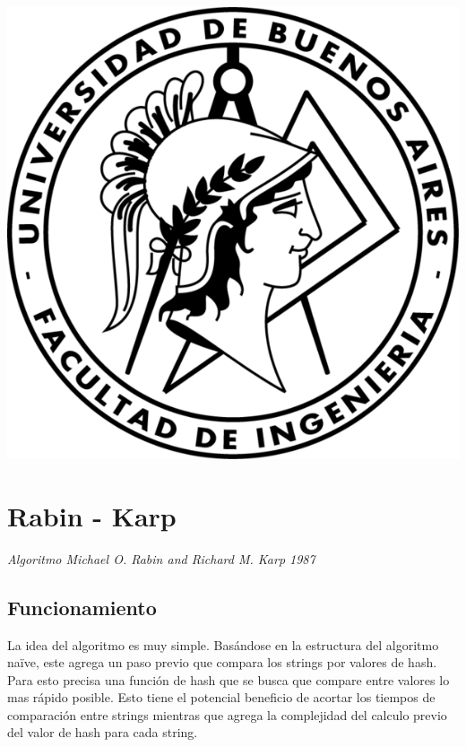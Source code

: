 \documentclass[a4paper, 10pt]{article}
\newcommand\tab[1][0.5cm]{\hspace*{#1}}
\begin{document}
    \newpage

    \begin{center}
        \includegraphics{images/logo}
    \end{center}


    \maketitle
    \newpage
    \tableofcontents
    \newpage
	
	\section{Rabin - Karp}
		
		\emph{Algoritmo Michael O. Rabin and Richard M. Karp 1987}
		
		\subsection{Funcionamiento}
		\tab La idea del algoritmo es muy simple. Basándose en la estructura del algoritmo naïve, este 				agrega un paso previo que compara los strings por valores de hash. Para esto precisa una función de 		hash que se busca que compare entre valores lo mas rápido posible. Esto tiene el potencial 					beneficio de acortar los tiempos de comparación entre strings mientras que agrega la complejidad 			del calculo previo del valor de hash para cada string.
		
\end{document}

